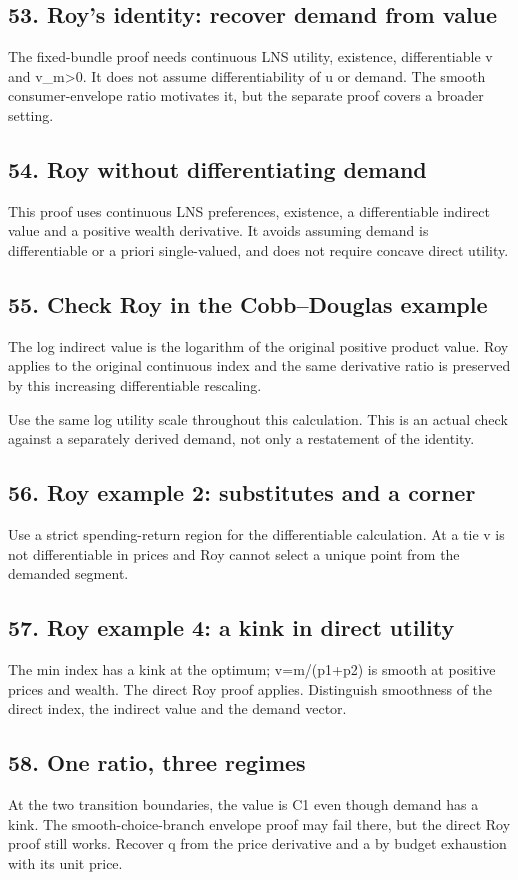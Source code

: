 \documentclass[11pt,a4paper]{article}
\begin{document}
\subsection*{53. Roy’s identity: recover demand from value}
The fixed-bundle proof needs continuous LNS utility, existence, differentiable v and v\_m>0. It does not assume differentiability of u or demand. The smooth consumer-envelope ratio motivates it, but the separate proof covers a broader setting.

\subsection*{54. Roy without differentiating demand}
This proof uses continuous LNS preferences, existence, a differentiable indirect value and a positive wealth derivative. It avoids assuming demand is differentiable or a priori single-valued, and does not require concave direct utility.

\subsection*{55. Check Roy in the Cobb--Douglas example}
The log indirect value is the logarithm of the original positive product value. Roy applies to the original continuous index and the same derivative ratio is preserved by this increasing differentiable rescaling.

Use the same log utility scale throughout this calculation. This is an actual check against a separately derived demand, not only a restatement of the identity.

\subsection*{56. Roy example 2: substitutes and a corner}
Use a strict spending-return region for the differentiable calculation. At a tie v is not differentiable in prices and Roy cannot select a unique point from the demanded segment.

\subsection*{57. Roy example 4: a kink in direct utility}
The min index has a kink at the optimum; v=m/(p1+p2) is smooth at positive prices and wealth. The direct Roy proof applies. Distinguish smoothness of the direct index, the indirect value and the demand vector.

\subsection*{58. One ratio, three regimes}
At the two transition boundaries, the value is C1 even though demand has a kink. The smooth-choice-branch envelope proof may fail there, but the direct Roy proof still works. Recover q from the price derivative and a by budget exhaustion with its unit price.
\end{document}
